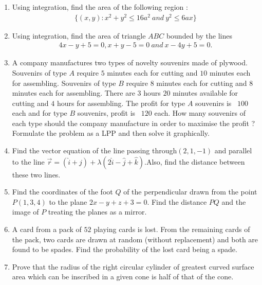 \documentclass[10pt,-letter paper]{article}
\providecommand{\brak}[1]{\ensuremath{\left(#1\right)}}
\begin{document}
\begin{enumerate}
\item Using integration, find the area of the following region :
	\begin{align*}
	\{\brak{x,y}:x^2+y^2\leq16a^2~and~y^2\leq6ax\}
	\end{align*}

	\item Using integration, find the area of triangle $ABC$ bounded by the lines 
		\begin{align*}
		4x-y+5=0, x+y-5=0~and~x-4y+5=0.
		\end{align*}

		\item A company manufactures two types of novelty souvenirs made of plywood. Souvenirs of type $A$ require $5$ minutes each for cutting and $10$ minutes each for assembling. Souvenirs of type $B$ require $8$ minutes each for cutting and $8$ minutes each for assembling. There are $3$ hours $20$ minutes available for cutting and $4$ hours for assembling. The profit for type $A$ souvenirs is \rupee~$100$ each and for type $B$ souvenirs, profit is \rupee~$120$ each. How many souvenirs of each type should the company manufacture in order to maximise the profit ? Formulate the problem as a LPP and then solve it graphically.

		\item Find the vector equation of the line passing through$\brak{2,1,-1}$ and parallel to the line $\overrightarrow{r}=\brak{\hat{i}+\hat{j}}+\lambda\brak{2\hat{i}-\hat{j}+\hat{k}}$.Also, find the distance between these two lines.


		\item Find the coordinates of the foot $Q$ of the perpendicular drawn from the point $P\brak{1,3,4}$ to the plane $2x-y+z+3=0$. Find the distance $PQ$ and the image of $P$ treating the planes as a mirror.

		\item A card from a pack of $52$ playing cards is lost. From the remaining cards of the pack, two cards are drawn at random (without replacement) and both are found to be spades. Find the probability of the lost card being a spade.

		\item Prove that the radius of the right circular cylinder of greatest curved surface area which can be inscribed in a given cone is half of that of the cone.
		
\end{enumerate}
     
\end{document}
